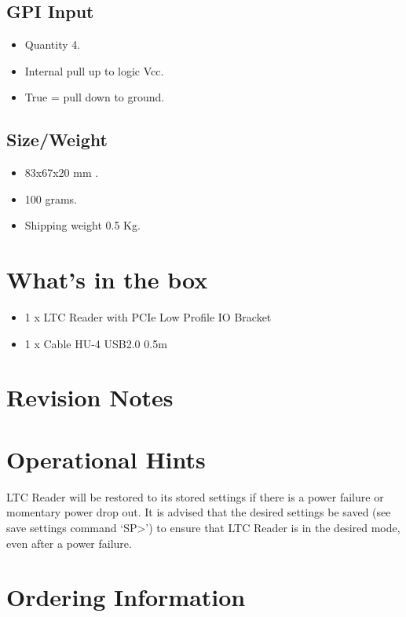 \documentclass{article}
\begin{document}
	\subsection{GPI Input}\label{gpi-input}
		\begin{itemize}
			\item
			Quantity 4.
			\item
			Internal pull up to logic Vcc.
			\item
			True = pull down to ground.
		\end{itemize}
	
	\subsection{Size/Weight}\label{sizeweight}
		\begin{itemize}
			\item
			83x67x20 mm .
			\item
			100 grams.
			\item
			Shipping weight 0.5 Kg.
		\end{itemize}
	
	\section{What's in the box}\label{whats-in-the-box}
		\begin{itemize}
			\item
			1 x LTC Reader with PCIe Low Profile IO Bracket
			\item
			1 x Cable HU-4 USB2.0 0.5m
		\end{itemize}
	
	\section{Revision Notes}\label{revision-notes}
	
	\section{Operational Hints}\label{operational-hints}
		LTC Reader will be restored to its stored settings if there is a power
		failure or momentary power drop out. It is advised that the desired
		settings be saved (see save settings command `SP\textgreater{}') to
		ensure that LTC Reader is in the desired mode, even after a power
		failure.
	
	\section{Ordering Information}\label{ordering-information}
\end{document}
